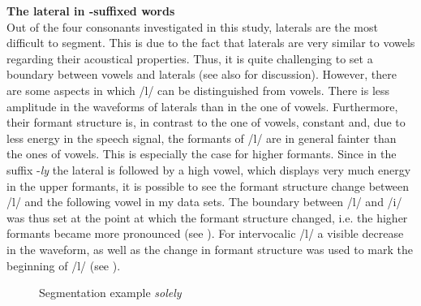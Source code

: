 \textbf {The lateral in -suffixed words} \label{ly-segmentation}\\




Out of the four consonants investigated in this study, laterals are the most difficult to segment. This is due to the fact that laterals are very similar to vowels regarding their acoustical properties. Thus, it is quite challenging to set a boundary between vowels and laterals (see also \citet[chapter 7]{Machac.2009} for discussion). However, there are some aspects in which /l/ can be distinguished from vowels. There is less amplitude in the waveforms of laterals than in the one of vowels.  Furthermore, their formant structure is, in contrast to the one of vowels, constant and, due to less energy in the speech signal, the formants of /l/ are in general fainter than the ones of vowels. This is especially the case for higher formants. Since in the suffix -\textit{ly} the lateral is followed by a high vowel, which displays very much energy in the upper formants, it is possible to see the formant structure change between /l/ and the following vowel in my data sets. The boundary between /l/ and /i/ was thus set at the point at which the formant structure changed, i.e. the higher formants became more pronounced (see ). For intervocalic /l/ a visible decrease in the waveform, as well as the change in formant structure was used to mark the beginning of /l/ (see ).
 
\begin{figure} [h!]
	
	\caption{Segmentation example \textit{solely}}
	\label{fig:segmentation solely}
\end{figure}


